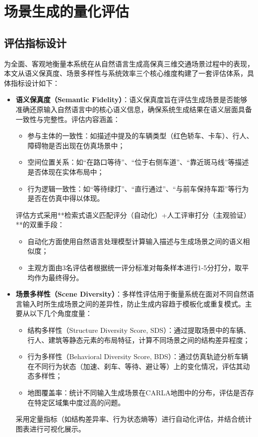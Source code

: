 \chapter{场景生成的量化评估}

\section{评估指标设计}
为全面、客观地衡量本系统在从自然语言生成高保真三维交通场景过程中的表现，本文从语义保真度、场景多样性与系统效率三个核心维度构建了一套评估体系，具体指标设计如下：

\begin{itemize}
	\item \textbf{语义保真度（Semantic Fidelity）}：语义保真度旨在评估生成场景是否能够准确还原输入自然语言中的核心语义信息，确保系统生成结果在语义层面具备一致性与完整性。评估内容涵盖：
	\begin{itemize}
		\item 参与主体的一致性：如描述中提及的车辆类型（红色轿车、卡车）、行人、障碍物是否出现在仿真场景中；
		\item 空间位置关系：如“在路口等待”、“位于右侧车道”、“靠近斑马线”等描述是否体现在实体布局中；
		\item 行为逻辑一致性：如“等待绿灯”、“直行通过”、“与前车保持车距”等行为是否在仿真中得以体现。
	\end{itemize}
	评估方式采用**检索式语义匹配评分（自动化）+人工评审打分（主观验证）**的双重手段：
	\begin{itemize}
		\item 自动化方面使用自然语言处理模型计算输入描述与生成场景之间的语义相似度；
		\item 主观方面由3名评估者根据统一评分标准对每条样本进行1-5分打分，取平均作为最终得分。
	\end{itemize}
	
	\item \textbf{场景多样性（Scene Diversity）}：多样性评估用于衡量系统在面对不同自然语言输入时所生成场景之间的差异性，防止生成内容趋于模板化或重复模式。主要从以下几个角度度量：
	\begin{itemize}
		\item 结构多样性（Structure Diversity Score, SDS）：通过提取场景中的车辆、行人、建筑等静态元素的布局特征，计算不同场景之间的结构差异程度；
		\item 行为多样性（Behavioral Diversity Score, BDS）：通过仿真轨迹分析车辆在不同行为状态（加速、刹车、等待、避让等）上的变化情况，评估其动态多样性；
		\item 地图覆盖率：统计不同输入生成场景在CARLA地图中的分布，评估是否存在特定区域集中度过高的问题。
	\end{itemize}
	采用定量指标（如结构差异率、行为状态熵等）进行自动化评估，并结合统计图表进行可视化展示。
	

\end{itemize}
